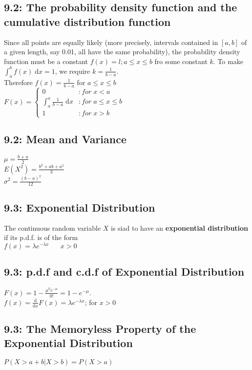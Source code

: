 \documentclass[11pt]{article}
\begin{document}
     	\subsection*{9.2: The probability density function and the cumulative distribution function}
     		Since all points are equally likely (more precisely, intervals contained in $[a,b]$ of a given length, say 0.01, all have the same probability), the probability density function must be a constant $f(x)=l;a\leq x \leq b$ fro some constant $k$. To make $\int_a^b \! f(x) \; \mathrm{d}x = 1$, we require $k = \frac{1}{b-a}$.\\
     		Therefore $f(x)= \frac{1}{b-a}$ for $a \leq x \leq b$\\
     		$F(x) = \left\{
     		\begin{array}{lr}
     		 0 & : for\; x< a\\
     		 \int_a^x \! \frac{1}{b-a} \; \mathrm{d}x & : for\; a \leq x \leq b \\
     		 1 & : for\; x > b
     		
     		\end{array}
     		\right.$
     		
     	\subsection*{9.2: Mean and Variance}
     		$\mu = \frac{b+a}{2}$\\
     		$E(X^2)=\frac{b^2+ab+a^2}{3}$\\
     		$\sigma^2 = \frac{(b-a)^2}{12}$
     	
     	\subsection*{9.3: Exponential Distribution}
     		The continuous random variable $X$ is siad to have an {\bf exponential distribution} if its p.d.f. is of the form\\
     		$f(x) = \lambda e^{-\lambda x} \; \;\;\;\;\; x> 0$
     	
     	\subsection*{9.3: p.d.f and c.d.f of Exponential Distribution}
     		$F(x)=1-\frac{\mu^0 e^{-\mu}}{0!} = 1-e^{-\mu}$.\\
     		$f(x)=\frac{\mathrm{d}}{\mathrm{d}x} F(x) = \lambda e^{-\lambda x}$; for $x>0$
     	\subsection*{9.3: The Memoryless Property of the Exponential Distribution}
     	 	$P(X>a+b|X>b)=P(X>a)$
\end{document}
